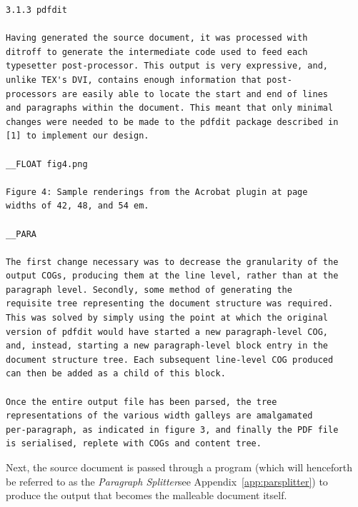 \begin{lstlisting}[label=lst:sourcedoc,captionpos=b,float,basicstyle=\ttfamily\footnotesize,caption={[An excerpt from a sample source document]An excerpt from a sample source document, itself an excerpt from \cite{Pinkney2011}. The document is parsed from top to bottom. Paragraphs are separated by blank lines. Floats are specified by lines that begin \texttt{\_\_FLOAT} and contain a reference to an image. Subsequent lines, until the next \texttt{\_\_FLOAT} or \texttt{\_\_PARA} marker, are interpreted as the float caption.}]
3.1.3 pdfdit

Having generated the source document, it was processed with
ditroff to generate the intermediate code used to feed each
typesetter post-processor. This output is very expressive, and,
unlike TEX's DVI, contains enough information that post-
processors are easily able to locate the start and end of lines
and paragraphs within the document. This meant that only minimal
changes were needed to be made to the pdfdit package described in
[1] to implement our design.

__FLOAT fig4.png

Figure 4: Sample renderings from the Acrobat plugin at page
widths of 42, 48, and 54 em.

__PARA

The first change necessary was to decrease the granularity of the
output COGs, producing them at the line level, rather than at the
paragraph level. Secondly, some method of generating the
requisite tree representing the document structure was required.
This was solved by simply using the point at which the original
version of pdfdit would have started a new paragraph-level COG,
and, instead, starting a new paragraph-level block entry in the
document structure tree. Each subsequent line-level COG produced
can then be added as a child of this block.

Once the entire output file has been parsed, the tree
representations of the various width galleys are amalgamated
per-paragraph, as indicated in figure 3, and finally the PDF file
is serialised, replete with COGs and content tree.

\end{lstlisting}


Next, the source document is passed through a program (which will henceforth be referred to as the \emph{Paragraph Splitter}\ed see Appendix~\ref{app:parsplitter}) to produce the output that becomes the malleable document itself.

